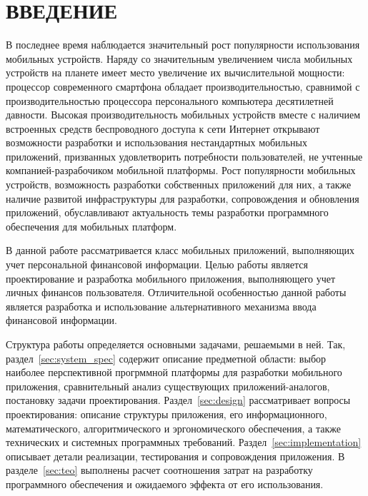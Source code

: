 \section*{ВВЕДЕНИЕ}

В последнее время наблюдается значительный рост
популярности использования мобильных устройств.
Наряду со значительным увеличением числа мобильных устройств
на планете имеет место увеличение их вычислительной мощности:
процессор современного смартфона обладает производительностью,
сравнимой с производительностью процессора персонального
компьютера десятилетней давности.
Высокая производительность мобильных устройств вместе с наличием
встроенных средств беспроводного доступа к сети Интернет открывают
возможности разработки и использования нестандартных мобильных
приложений, призванных удовлетворить потребности пользователей,
не учтенные компанией-разрабочиком мобильной платформы.
Рост популярности мобильных устройств, возможность разработки собственных
приложений для них, а также наличие развитой инфраструктуры для разработки,
сопровождения и обновления приложений, обуславливают актуальность темы
разработки программного обеспечения для мобильных платформ.

В данной работе рассматривается класс мобильных приложений,
выполняющих учет персональной финансовой информации.
Целью работы является проектирование и разработка мобильного приложения,
выполняющего учет личных финансов пользователя.
Отличительной особенностью данной работы является разработка и использование
альтернативного механизма ввода финансовой информации.

Структура работы определяется основными задачами, решаемыми в ней.
Так, раздел~\ref{sec:system_spec} содержит описание предметной области:
выбор наиболее перспективной прогрммной платформы
для разработки мобильного приложения,
сравнительный анализ существующих приложений-аналогов,
постановку задачи проектирования.
Раздел~\ref{sec:design} рассматривает вопросы проектирования:
описание структуры приложения,
его информационного, математического, алгоритмического и эргономического обеспечения,
а также технических и системных программных требований.
Раздел~\ref{sec:implementation} описывает детали реализации,
тестирования и сопровождения приложения.
В разделе~\ref{sec:teo} выполнены расчет
соотношения затрат на разработку программного обеспечения
и ожидаемого эффекта от его использования.
